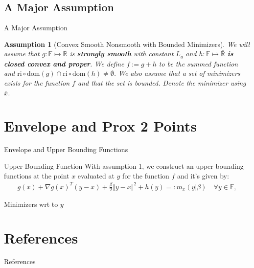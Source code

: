 \documentclass[11pt]{beamer}
\newtheorem{assumption}{Assumption}
\begin{document}
    \subsection{A Major Assumption}    
        \begin{frame}{A Major Assumption}
            \begin{assumption}[Convex Smooth Nonsmooth with Bounded Minimizers]\label{assumption:1}
                We will assume that $g:\mathbb E\mapsto \mathbb R$ is \textbf{strongly smooth} with constant $L_g$ and $h:\mathbb E \mapsto \bar{\mathbb R}$ \textbf{is closed convex and proper}. We define $f := g + h$ to be the summed function and $\text{ri}\circ \text{dom}(g) \cap \text{ri}\circ \text{dom}(h) \neq \emptyset$. We also assume that a set of minimizers exists for the function $f$ and that the set is bounded. Denote the minimizer using $\bar x$. 
            \end{assumption}
        \end{frame}
        
    
\section{Envelope and Prox 2 Points}
    \begin{frame}{Envelope and Upper Bounding Functions}
        \begin{block}{Upper Bounding Function}
            With assumption 1, we construct an upper bounding functions at the point $x$ evaluated at $y$ for the function $f$ and it's given by: 
            \begin{align*}
                g(x) + \nabla g(x)^T(y - x) + \frac{\beta}{2} \Vert y - x\Vert^2
                + h(y) =: m_x(y|\beta) \quad \forall y \in \mathbb E, 
            \end{align*}    
        \end{block}
        \begin{block}{Minimizers wrt to $y$}
            
        \end{block}
        
    \end{frame}


   

\section{References}
    \begin{frame}{References}
        
    \end{frame}
\end{document}

